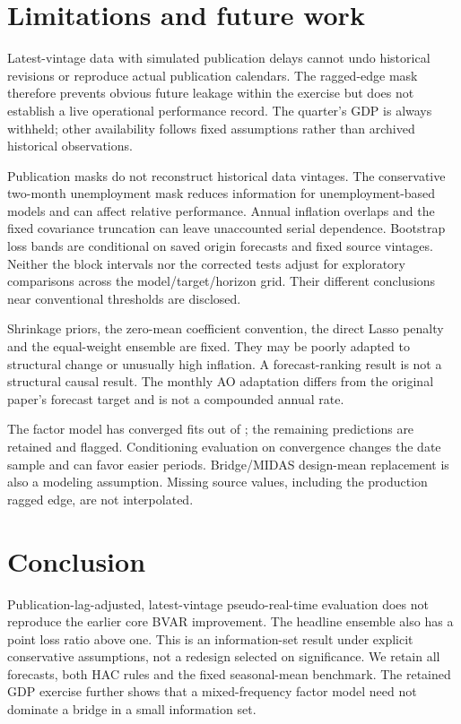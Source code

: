 \section{Limitations and future work}
Latest-vintage data with simulated publication delays cannot undo historical revisions or reproduce actual publication calendars. The ragged-edge mask therefore prevents obvious future leakage within the exercise but does not establish a live operational performance record. The quarter's GDP is always withheld; other availability follows fixed assumptions rather than archived historical observations.

Publication masks do not reconstruct historical data vintages. The conservative two-month unemployment mask reduces information for unemployment-based models and can affect relative performance. Annual inflation overlaps and the fixed covariance truncation can leave unaccounted serial dependence. Bootstrap loss bands are conditional on saved origin forecasts and fixed source vintages. Neither the block intervals nor the corrected tests adjust for exploratory comparisons across the model/target/horizon grid. Their different conclusions near conventional thresholds are disclosed.

Shrinkage priors, the zero-mean coefficient convention, the direct Lasso penalty and the equal-weight ensemble are fixed. They may be poorly adapted to structural change or unusually high inflation. A forecast-ranking result is not a structural causal result. The monthly AO adaptation differs from the original paper's forecast target and is not a compounded annual rate.

The factor model has \DFMConverged{} converged fits out of \DFMTotal{}; the remaining \DFMFailed{} predictions are retained and flagged. Conditioning evaluation on convergence changes the date sample and can favor easier periods. Bridge/MIDAS design-mean replacement is also a modeling assumption. Missing source values, including the production ragged edge, are not interpolated.
\section{Conclusion}
Publication-lag-adjusted, latest-vintage pseudo-real-time evaluation does not reproduce the earlier core BVAR improvement. The headline ensemble also has a point loss ratio above one. This is an information-set result under explicit conservative assumptions, not a redesign selected on significance. We retain all forecasts, both HAC rules and the fixed seasonal-mean benchmark. The retained GDP exercise further shows that a mixed-frequency factor model need not dominate a bridge in a small information set.


